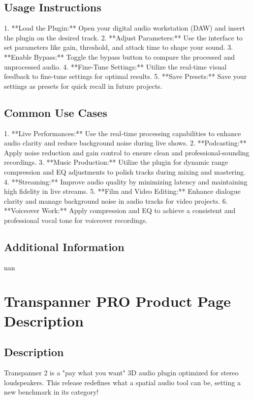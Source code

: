 \documentclass[8pt]{article}
\begin{document}
    \subsection*{Usage Instructions}
    1. **Load the Plugin:** Open your digital audio workstation (DAW) and insert the plugin on the desired track.
2. **Adjust Parameters:** Use the interface to set parameters like gain, threshold, and attack time to shape your sound.
3. **Enable Bypass:** Toggle the bypass button to compare the processed and unprocessed audio.
4. **Fine-Tune Settings:** Utilize the real-time visual feedback to fine-tune settings for optimal results.
5. **Save Presets:** Save your settings as presets for quick recall in future projects.

    \subsection*{Common Use Cases}
    1. **Live Performances:** Use the real-time processing capabilities to enhance audio clarity and reduce background noise during live shows.
2. **Podcasting:** Apply noise reduction and gain control to ensure clean and professional-sounding recordings.
3. **Music Production:** Utilize the plugin for dynamic range compression and EQ adjustments to polish tracks during mixing and mastering.
4. **Streaming:** Improve audio quality by minimizing latency and maintaining high fidelity in live streams.
5. **Film and Video Editing:** Enhance dialogue clarity and manage background noise in audio tracks for video projects.
6. **Voiceover Work:** Apply compression and EQ to achieve a consistent and professional vocal tone for voiceover recordings.

    \subsection*{Additional Information}
    nan
    

    \section*{Transpanner PRO  Product Page Description}

    \subsection*{Description}
    Transpanner 2 is a "pay what you want" 3D audio plugin optimized for stereo loudspeakers. This release redefines what a spatial audio tool can be, setting a new benchmark in its category!
\end{document}
